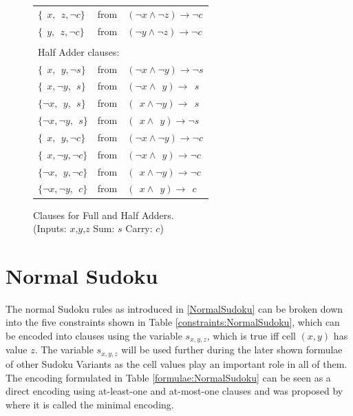 \begin{figure}
\begin{tabular}{l l l}
     $\{~~x, ~~z, \neg c\}$          & from & $(\neg x      \land \neg z)   \rightarrow \neg c$ \\
     $\{~~y, ~~z, \neg c\}$          & from & $(\neg y      \land \neg z)   \rightarrow \neg c$ \\
     &&\\
     \multicolumn {3}{l}{Half Adder clauses:}\\
     $\{~~x, ~~y, \neg s\}$          & from & $(\neg x      \land \neg y)   \rightarrow \neg s$ \\
     $\{~~x, \neg y, ~~s\}$          & from & $(\neg x      \land ~~y)      \rightarrow ~~s$ \\
     $\{\neg x, ~~y, ~~s\}$          & from & $(~~x         \land \neg y)   \rightarrow ~~s$ \\
     $\{\neg x, \neg y, ~~s\}$       & from & $(~~x         \land ~~y)   \rightarrow \neg s$ \\
     $\{~~x, ~~y, \neg c\}$          & from & $(\neg x      \land \neg y)   \rightarrow \neg c$ \\
     $\{~~x, \neg y, \neg c\}$          & from & $(\neg x      \land ~~y)      \rightarrow \neg c$ \\
     $\{\neg x, ~~y, \neg c\}$          & from & $(~~x         \land \neg y)   \rightarrow \neg c$ \\
     $\{\neg x, \neg y, ~~c\}$       & from & $(~~x         \land ~~y)   \rightarrow ~~c$ \\
    \end{tabular}
    \caption{Clauses for Full and Half Adders.\\
    (Inputs: $x$,$y$,$z$  Sum: $s$  Carry: $c$)}
    \label{AdderNetworkClauses}
\end{figure}

\newpage
\section{Normal Sudoku}
The normal Sudoku rules as introduced in \ref{NormalSudoku} can be broken down into the five constraints shown in Table \ref{constraints:NormalSudoku}, which can be encoded into clauses using the variable $s_{x,y,z}$, which is true iff cell $(x,y)$ has value $z$. The variable $s_{x,y,z}$ will be used further during the later shown formulae of other Sudoku Variants as the cell values play an important role in all of them. The encoding formulated in Table \ref{formulae:NormalSudoku} can be seen as a direct encoding using at-least-one and at-most-one clauses and was proposed by \cite{Lynce2006SudokuAsASATProblem} where it is called the minimal encoding.\\


